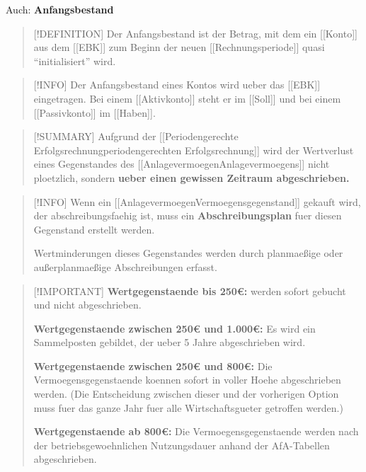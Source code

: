 Auch: \textbf{Anfangsbestand}

\begin{quote}
{[}!DEFINITION{]} Der Anfangsbestand ist der Betrag, mit dem ein
{[}{[}Konto{]}{]} aus dem {[}{[}EBK{]}{]} zum Beginn der neuen
{[}{[}Rechnungsperiode{]}{]} quasi ``initialisiert'' wird.
\end{quote}

\begin{quote}
{[}!INFO{]} Der Anfangsbestand eines Kontos wird ueber das
{[}{[}EBK{]}{]} eingetragen. Bei einem {[}{[}Aktivkonto{]}{]} steht er
im {[}{[}Soll{]}{]} und bei einem {[}{[}Passivkonto{]}{]} im
{[}{[}Haben{]}{]}.
\end{quote}

\begin{quote}
{[}!SUMMARY{]} Aufgrund der {[}{[}Periodengerechte
Erfolgsrechnung\textbar periodengerechten Erfolgsrechnung{]}{]} wird der
Wertverlust eines Gegenstandes des
{[}{[}Anlagevermoegen\textbar Anlagevermoegens{]}{]} nicht ploetzlich,
sondern \textbf{ueber einen gewissen Zeitraum abgeschrieben.}
\end{quote}

\begin{quote}
{[}!INFO{]} Wenn ein
{[}{[}Anlagevermoegen\textbar Vermoegensgegenstand{]}{]} gekauft wird, der
abschreibungsfaehig ist, muss ein \textbf{Abschreibungsplan} fuer diesen
Gegenstand erstellt werden.

Wertminderungen dieses Gegenstandes werden durch planmaeßige oder
außerplanmaeßige Abschreibungen erfasst.
\end{quote}

\begin{quote}
{[}!IMPORTANT{]} \textbf{Wertgegenstaende bis 250€:} werden sofort
gebucht und nicht abgeschrieben.

\textbf{Wertgegenstaende zwischen 250€ und 1.000€:} Es wird ein
Sammelposten gebildet, der ueber 5 Jahre abgeschrieben wird.

\textbf{Wertgegenstaende zwischen 250€ und 800€:} Die
Vermoegensgegenstaende koennen sofort in voller Hoehe abgeschrieben werden.
(Die Entscheidung zwischen dieser und der vorherigen Option muss fuer das
ganze Jahr fuer alle Wirtschaftsgueter getroffen werden.)

\textbf{Wertgegenstaende ab 800€:} Die Vermoegensgegenstaende werden nach
der betriebsgewoehnlichen Nutzungsdauer anhand der AfA-Tabellen
abgeschrieben.
\end{quote}


